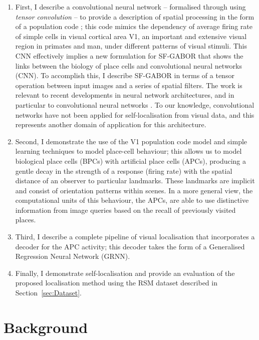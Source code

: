 \begin{enumerate}

\item First, I describe a convolutional neural network -- formalised through using \textit{tensor convolution} -- to provide a description of spatial processing in the form of a population code \cite{berens2012fast}; this code mimics the dependency of average firing rate of simple cells in visual cortical area V1, an important and extensive visual region in primates and man, under different patterns of visual stimuli. This CNN effectively implies a new formulation for SF-GABOR that shows the links between the biology of place cells and convolutional neural networks (CNN). To accomplish this, I describe SF-GABOR in terms of a tensor operation between input images and a series of spatial filters.  The work is relevant to recent developments in neural network architectures, and in particular to convolutional neural networks \cite{krizhevsky2012imagenet, lecun1995convolutional}.  To our knowledge, convolutional networks have not been applied for self-localisation from visual data, and this represents another domain of application for this architecture.

\item Second, I demonstrate the use of the V1 population code model and simple learning techniques to model place-cell behaviour; this allows us to model biological place cells (BPCs) with artificial place cells (APCs), producing a gentle decay in the strength of a response (firing rate) with the spatial distance of an observer to particular landmarks. These landmarks are implicit and consist of orientation patterns within scenes. In a more general view, the computational units of this behaviour, the APCs, are able to use distinctive information from image queries based on the recall of previously visited places. 

\item Third, I describe a complete pipeline of visual localisation that incorporates a decoder for the APC activity; this decoder takes the form of a Generalised Regression Neural Network (GRNN). 

\item Finally, I demonstrate self-localisation and provide an evaluation of the proposed localisation method using the RSM dataset described in Section~\ref{sec:Dataset}.

\end{enumerate}

\section{Background}

